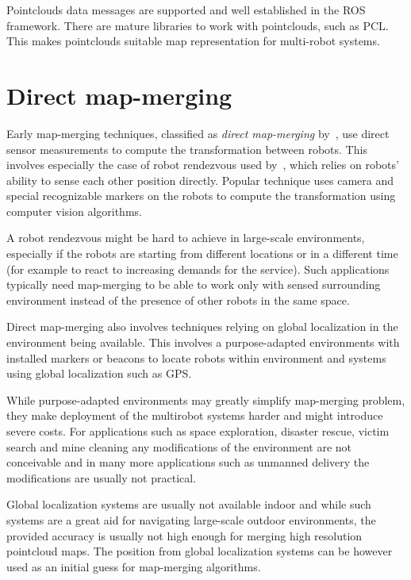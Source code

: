 Pointclouds data messages are supported and well established in the \gls{ROS} framework. There are mature libraries to work with pointclouds, such as \gls{PCL}. This makes pointclouds suitable map representation for multi-robot systems.

\section{Direct map-merging}

Early map-merging techniques, classified as \textit{direct map-merging} by~\citet{lee2012survey}, use direct sensor measurements to compute the transformation between robots. This involves especially the case of robot rendezvous used by~\citet{zhou2006rendezvous}, which relies on robots' ability to sense each other position directly. Popular technique uses camera and special recognizable markers on the robots to compute the transformation using computer vision algorithms.

A robot rendezvous might be hard to achieve in large-scale environments, especially if the robots are starting from different locations or in a different time (for example to react to increasing demands for the service). Such applications typically need map-merging to be able to work only with sensed surrounding environment instead of the presence of other robots in the same space.

Direct map-merging also involves techniques relying on global localization in the environment being available. This involves a purpose-adapted environments with installed markers or beacons to locate robots within environment and systems using global localization such as \gls{GPS}.

While purpose-adapted environments may greatly simplify map-merging problem, they make deployment of the multirobot systems harder and might introduce severe costs. For applications such as space exploration, disaster rescue, victim search and mine cleaning any modifications of the environment are not conceivable and in many more applications such as unmanned delivery the modifications are usually not practical.

Global localization systems are usually not available indoor and while such systems are a great aid for navigating large-scale outdoor environments, the provided accuracy is usually not high enough for merging high resolution pointcloud maps. The position from global localization systems can be however used as an initial guess for map-merging algorithms.

